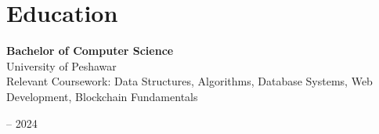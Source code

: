 \documentclass[10pt, letterpaper]{article}
\newenvironment{highlights}{
    \begin{itemize}[
        topsep=0.10 cm,
        parsep=0.10 cm,
        partopsep=0pt,
        itemsep=0pt,
        leftmargin=0.4 cm + 10pt
    ]
}{
    \end{itemize}
}
\newenvironment{threecolentry}[3][]{
    \onecolentry
    \def\thirdColumn{#3}
    \setcolumnwidth{1 cm, \fill, 4.5 cm}
    \begin{paracol}{3}
    {\raggedright #2} \switchcolumn
}{
    \switchcolumn \raggedleft \thirdColumn
    \end{paracol}
    \endonecolentry
}
\begin{document}
\section{Education}

\begin{threecolentry}{}{
		2020 – 2024
	}
	\textbf{Bachelor of Computer Science} \\
	University of Peshawar \\
	Relevant Coursework: Data Structures, Algorithms, Database Systems, Web Development, Blockchain Fundamentals
\end{threecolentry}

\end{document}
